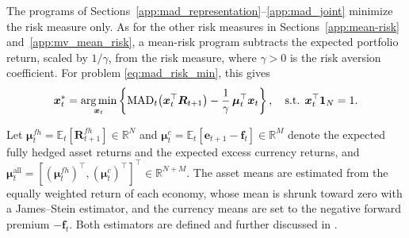 The programs of Sections~\ref{app:mad_representation}--\ref{app:mad_joint} minimize the risk measure only. As for the
other risk measures in Sections~\ref{app:mean-risk} and~\ref{app:mv_mean_risk}, a mean-risk program subtracts the
expected portfolio return, scaled by $1/\gamma$, from the risk measure, where $\gamma > 0$ is the risk aversion
coefficient. For problem \eqref{eq:mad_risk_min}, this gives
\begin{equation}
    \bm{x}_t^* = \operatorname*{arg\,min}_{\bm{x}_t} \left\{ \text{MAD}_t\bigl( \bm{x}_t^\top \bm{R}_{t+1} \bigr)
    - \frac{1}{\gamma}\, \bm{\mu}_t^\top \bm{x}_t \right\}, \quad \text{s.t. } \bm{x}_t^\top \bm{1}_N = 1.
\end{equation}

Let $\bm{\mu}^{fh}_t = \mathbb{E}_t[\bm{R}^{fh}_{t+1}] \in \mathbb{R}^N$ and
$\bm{\mu}^c_t = \mathbb{E}_t[\bm{e}_{t+1} - \bm{f}_t] \in \mathbb{R}^M$ denote the expected fully hedged asset returns and
the expected excess currency returns, and $\bm{\mu}^{\text{all}}_t = [(\bm{\mu}^{fh}_t)^\top, (\bm{\mu}^c_t)^\top]^\top
\in \mathbb{R}^{N+M}$. The asset means are estimated from the equally weighted return of each economy, whose mean is
shrunk toward zero with a James--Stein estimator, and the currency means are set to the negative forward premium
$-\bm{f}_t$. Both estimators are defined and further discussed in .

